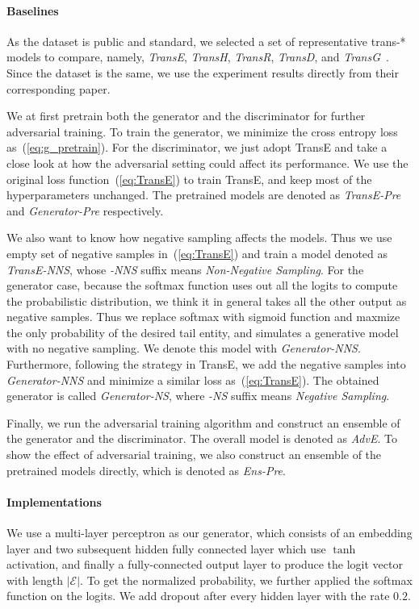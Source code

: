 \documentclass[twocolumn,a4paper,preprint,10pt,3p]{elsarticle}
\begin{document}
\paragraph{Baselines} As the dataset is public and standard, we selected a set of representative trans-* models to compare, namely, \emph{TransE}, \emph{TransH}, \emph{TransR}, \emph{TransD}, and \emph{TransG}~\cite{TransE2013,TransH2014,TransR2015,TransD,TransG}. Since the dataset is the same, we use the experiment results directly from their corresponding paper.

We at first pretrain both the generator and the discriminator for further adversarial training. To train the generator, we minimize the cross entropy loss as~(\ref{eq:g_pretrain}). For the discriminator, we just adopt TransE and take a close look at how the adversarial setting could affect its performance. We use the original loss function~(\ref{eq:TransE}) to train TransE, and keep most of the hyperparameters unchanged. The pretrained models are denoted as \emph{TransE-Pre} and \emph{Generator-Pre} respectively.

We also want to know how negative sampling affects the models. Thus we use empty set of negative samples in~(\ref{eq:TransE}) and train a model denoted as \emph{TransE-NNS}, whose \emph{-NNS} suffix means \emph{Non-Negative Sampling}. For the generator case, because the softmax function uses out all the logits to compute the probabilistic distribution, we think it in general takes all the other output as negative samples. Thus we replace softmax with sigmoid function and maxmize the only probability of the desired tail entity, and simulates a generative model with no negative sampling. We denote this model with \emph{Generator-NNS}. Furthermore, following the strategy in TransE, we add the negative samples into \emph{Generator-NNS} and  minimize a similar loss as~(\ref{eq:TransE}). The obtained generator is called \emph{Generator-NS}, where \emph{-NS} suffix means \emph{Negative Sampling}.

Finally, we run the adversarial training algorithm and construct an ensemble of the generator and the discriminator. The overall model is denoted as \emph{AdvE}. To show the effect of adversarial training, we also construct an ensemble of the pretrained models directly, which is denoted as \emph{Ens-Pre}.

\paragraph{Implementations} We use a multi-layer perceptron as our generator, which consists of an embedding layer and two subsequent hidden fully connected layer which use $\tanh$ activation, and finally a fully-connected output layer to produce the logit vector with length $\lvert\mathcal{E} \rvert$. To get the normalized probability, we further applied the softmax function on the logits. We add dropout after every hidden layer with the rate $0.2$.
\end{document}
